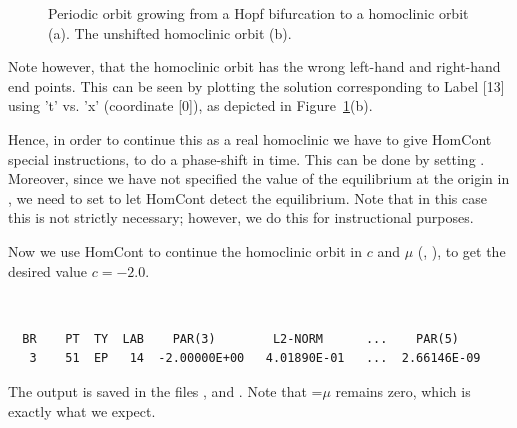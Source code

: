 \documentclass[12pt]{report}
\begin{document}
\begin{figure}[htb]
\begin{center}
\begin{picture}
\end{picture}
\caption{Periodic orbit growing from a Hopf bifurcation to a
  homoclinic orbit (a). The unshifted homoclinic orbit (b).}
\label{hopfbif}
\end{center}
\end{figure}

Note however, that the homoclinic orbit has the wrong left-hand and
right-hand end points. This can be seen by plotting the solution
corresponding to Label [13] using 't' vs. 'x' (coordinate [0]), 
as depicted in Figure~\ref{hopfbif}(b).

Hence, in order to continue this as a real homoclinic 
we have to give {\cal HomCont} special instructions, to do a phase-shift in
time. This can be done by setting . Moreover, 
since we have not specified the value of
the equilibrium at the origin in , 
we need to set  to let
{\cal HomCont} detect the equilibrium. Note that in this case this is not
strictly necessary; however, we do this for instructional purposes.

Now we use {\cal HomCont} to continue the homoclinic orbit in $c$ and $\mu$ 
(, ), to get the desired value $c=-2.0$.
\begin{center}
 \\
\end{center}
\begin{verbatim}
  BR    PT  TY  LAB    PAR(3)        L2-NORM      ...    PAR(5)     
   3    51  EP   14  -2.00000E+00   4.01890E-01   ...  2.66146E-09
\end{verbatim}
The output is saved in the files ,  and
. Note that =$\mu$ remains zero, which is exactly
what we expect.
\end{document}
